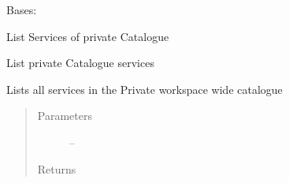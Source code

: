 \documentclass[letterpaper,10pt,english]{sphinxmanual}
\begin{document}
\begin{fulllineitems}
\label{_source/son_editor.apis:son_editor.apis.workspacesapi.PrivateServices}
Bases: 

List Services of private Catalogue

\begin{fulllineitems}
\label{_source/son_editor.apis:son_editor.apis.workspacesapi.PrivateServices.get}
List private Catalogue services

Lists all services in the Private workspace wide catalogue
\begin{quote}\begin{description}
\item[{Parameters}] \leavevmode
{} -- 

\item[{Returns}] \leavevmode


\end{description}\end{quote}

\end{fulllineitems}


\begin{fulllineitems}
\label{_source/son_editor.apis:son_editor.apis.workspacesapi.PrivateServices.methods}
\end{fulllineitems}


\end{fulllineitems}

\end{document}
